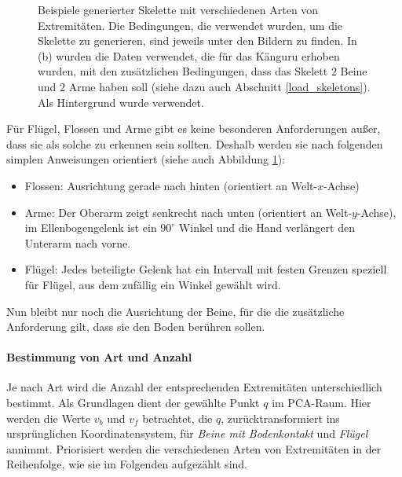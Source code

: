 \begin{figure}
 \caption{Beispiele generierter Skelette mit verschiedenen Arten von Extremitäten. Die Bedingungen, die verwendet wurden, um die Skelette zu generieren, sind jeweils unter den Bildern zu finden. In (b) wurden die Daten verwendet, die für das Känguru erhoben wurden, mit den zusätzlichen Bedingungen, dass das Skelett $2$ Beine und $2$ Arme haben soll (siehe dazu auch Abschnitt \ref{load_skeletons}). Als Hintergrund wurde \cite{background} verwendet.}
 \label{extremity_orientations}
\end{figure}

Für Flügel, Flossen und Arme gibt es keine besonderen Anforderungen außer, dass sie als solche zu erkennen sein sollten. Deshalb werden sie nach folgenden simplen Anweisungen orientiert (siehe auch Abbildung \ref{extremity_orientations}):
\begin{itemize}
 \item Flossen: Ausrichtung gerade nach hinten (orientiert an Welt-$x$-Achse)
 \item Arme: Der Oberarm zeigt senkrecht nach unten (orientiert an Welt-$y$-Achse), im Ellenbogengelenk ist ein $90^{\circ}$ Winkel und die Hand verlängert den Unterarm nach vorne.
 \item Flügel: Jedes beteiligte Gelenk hat ein Intervall mit festen Grenzen speziell für Flügel, aus dem zufällig ein Winkel gewählt wird.
\end{itemize}

Nun bleibt nur noch die Ausrichtung der Beine, für die die zusätzliche Anforderung gilt, dass sie den Boden berühren sollen.


\paragraph{Bestimmung von Art und Anzahl}

Je nach Art wird die Anzahl der entsprechenden Extremitäten unterschiedlich bestimmt. Als Grundlagen dient der gewählte Punkt $q$ im PCA-Raum. Hier werden die Werte $v_b$ und $v_f$ betrachtet, die $q$, zurücktransformiert ins ursprünglichen Koordinatensystem, für \emph{Beine mit Bodenkontakt} und \emph{Flügel} annimmt. Priorisiert werden die verschiedenen Arten von Extremitäten in der Reihenfolge, wie sie im Folgenden aufgezählt sind.

